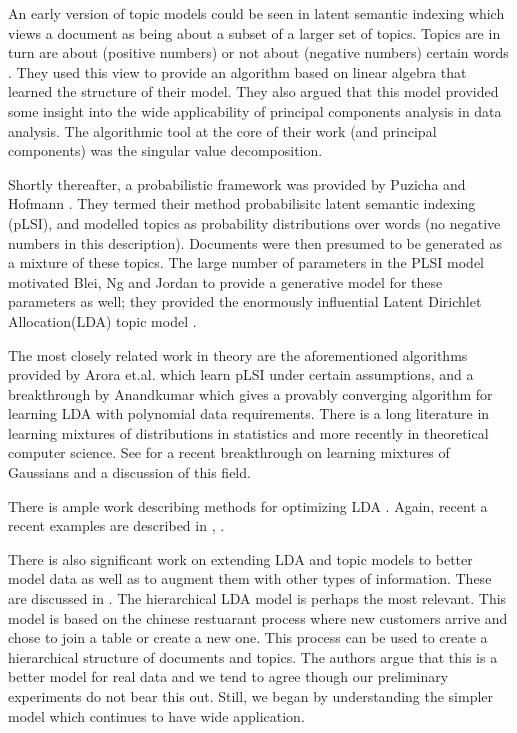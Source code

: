 An early version of topic models could be seen in latent semantic
indexing which views a document as being about a subset of a larger
set of topics.  Topics are in turn are about (positive numbers) or not
about (negative numbers) certain words \cite{Papadimitriou1997}.  They
used this view to provide an algorithm based on linear algebra that
learned the structure of their model.  They also argued that this
model provided some insight into the wide applicability of principal
components analysis in data analysis. The algorithmic tool at the core
of their work (and principal components) was the singular value
decomposition.

Shortly thereafter, a probabilistic framework was provided by Puzicha
and Hofmann \cite{Hofmann04}.  They termed their method probabilisitc latent
semantic indexing (pLSI), and modelled topics as probability
distributions over words (no negative numbers in this description).
Documents were then presumed to be generated as a mixture of these
topics.  The large number of parameters in the PLSI model motivated
Blei, Ng and Jordan to provide a generative model for these parameters
as well; they provided the enormously influential Latent Dirichlet
Allocation(LDA) topic model \cite{Blei2003a}.

The most closely related work in theory are the aforementioned
algorithms provided by Arora et.al. \cite{Arora2012} which learn pLSI
under certain assumptions, and a breakthrough by
Anandkumar\cite{AnandLDA} which gives a provably converging algorithm
for learning LDA with polynomial data requirements.  There is a long
literature in learning mixtures of distributions in statistics and
more recently in theoretical computer science. See
\cite{MoitraValiant} for a recent breakthrough on learning mixtures of
Gaussians and a discussion of this field.

There is ample work describing methods for optimizing
LDA \cite{BleiCACM}.  Again, recent a recent examples are described
in \cite{McCallumMALLET}, \cite{BleiCBA}. 

There is also significant work on extending LDA and topic models to
better model data as well as to augment them with other types of
information.  These are discussed in \cite{BleiCACM}.  The
hierarchical LDA model \cite{BleiCM} is perhaps the most relevant.
This model is based on the chinese restuarant process where new
customers arrive and chose to join a table or create a new one.  This
process can be used to create a hierarchical structure of documents
and topics. The authors argue that this is a better model for real
data and we tend to agree though our preliminary experiments do not
bear this out.  Still, we began by understanding the simpler model
which continues to have wide application.  

